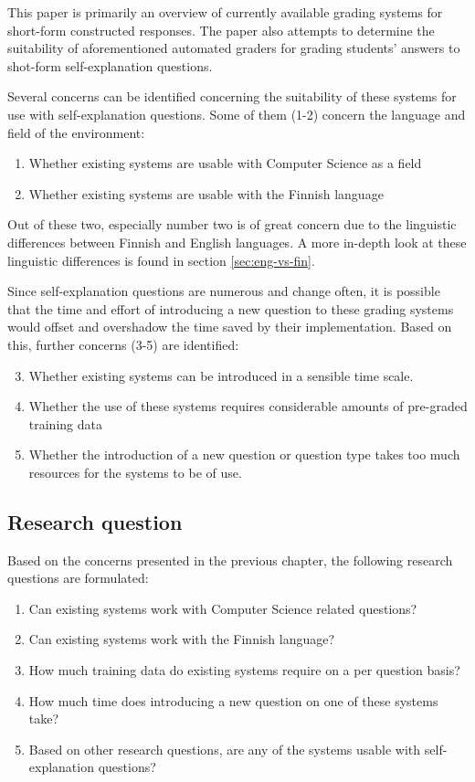 \documentclass[english]{tktltiki2}
\theoremstyle{definition}
\theoremstyle{remark}
\begin{document}
This paper is primarily an overview of currently available grading systems for short-form constructed responses.
The paper also attempts to determine the suitability of aforementioned automated graders for grading students' answers to shot-form self-explanation questions.

Several concerns can be identified concerning the suitability of these systems for use with self-explanation questions. Some of them (1-2) concern the language and field of the environment:
\begin{enumerate}
	\item Whether existing systems are usable with Computer Science as a field
	\item Whether existing systems are usable with the Finnish language
\end{enumerate}

Out of these two, especially number two is of great concern due to the linguistic differences between Finnish  and English languages. A more in-depth look at these linguistic differences is found in section \ref{sec:eng-vs-fin}.

Since self-explanation questions are numerous and change often, it is possible that the time and effort of introducing a new question to these grading systems would offset and overshadow the time saved by their implementation. Based on this, further concerns (3-5) are identified:
\begin{enumerate}
	\setcounter{enumi}{2}
	\item Whether existing systems can be introduced in a sensible time scale.
	\item Whether the use of these systems requires considerable amounts of pre-graded training data
	\item Whether the introduction of a new question or question type takes too much resources for the systems to be of use.
\end{enumerate}

\subsection{Research question}

Based on the concerns presented in the previous chapter, the following research questions are formulated:

\begin{enumerate}
	\item Can existing systems work with Computer Science related questions?
	\item Can existing systems work with the Finnish language?
	\item How much training data do existing systems require on a per question basis?
	\item How much time does introducing a new question on one of these systems take?
	\item Based on other research questions, are any of the systems usable with self-explanation questions?
\end{enumerate}
\end{document}
